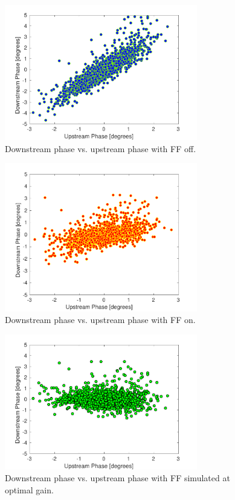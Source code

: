 \begin{figure}
  \centering
  \includegraphics[width=0.75\textwidth]{Figures/feedforward/longFF_scatterFFOff}
  \caption{Downstream phase vs. upstream phase with FF off.}
  \label{f:longFF_scatterFFOff}
\end{figure}

\begin{figure}
  \centering
  \includegraphics[width=0.75\textwidth]{Figures/feedforward/longFF_scatterFFOn}
  \caption{Downstream phase vs. upstream phase with FF on.}
  \label{f:longFF_scatterFFOn}
\end{figure}

\begin{figure}
  \centering
  \includegraphics[width=0.75\textwidth]{Figures/feedforward/longFF_scatterFFSimOpt}
  \caption{Downstream phase vs. upstream phase with FF simulated at optimal gain.}
  \label{f:longFF_scatterFFSimOpt}
\end{figure}

